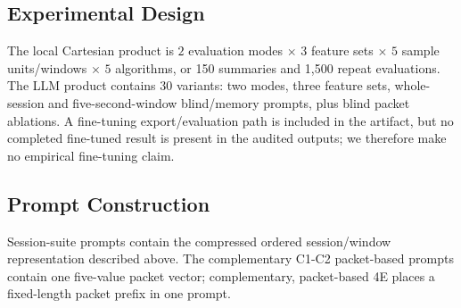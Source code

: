 \documentclass[letterpaper,twocolumn,10pt]{article}
\begin{document}
\begin{table}[t]
\centering
\caption{Experiment matrix. ``B/D'' denotes balanced and real-world deployment deployment modes.}
\label{tab:experiment-matrix}
\footnotesize
{}
\end{table}

\subsection{Experimental Design}

The local Cartesian product is $2$ evaluation modes $\times$ $3$ feature sets $\times$ $5$ sample units/windows $\times$ $5$ algorithms, or 150 summaries and 1{,}500 repeat evaluations. The LLM product contains 30 variants: two modes, three feature sets, whole-session and five-second-window blind/memory prompts, plus blind packet ablations. A fine-tuning export/evaluation path is included in the artifact, but no completed fine-tuned result is present in the audited outputs; we therefore make no empirical fine-tuning claim.

\subsection{Prompt Construction}
\label{subsec:prompting}

Session-suite prompts contain the compressed ordered session/window representation described above. The complementary C1-C2 packet-based prompts contain one five-value packet vector; complementary, packet-based 4E places a fixed-length packet prefix in one prompt.
\end{document}
